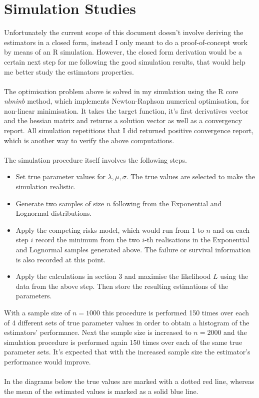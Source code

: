 \documentclass{article}
\begin{document}
\section{Simulation Studies}
\indent \indent Unfortunately the current scope of this document doesn't involve deriving the estimators in a closed form, instead I only meant to do a proof-of-concept work by means of an R simulation. However, the closed form derivation would be a certain next step for me following the good simulation results, that would help me better study the estimators properties. 
\\
\\
\indent The optimisation problem above is solved in my simulation using the R core \textit{nlminb} method, which implements Newton-Raphson numerical optimisation, for non-linear minimisation. It takes the target function, it's first derivatives vector and the hessian matrix and returns a solution vector as well as a convergency report. All simulation repetitions that I did returned positive convergence report, which is another way to verify the above computations.
\\
\\
\indent The simulation procedure itself involves the following steps.
\begin{itemize}
\item Set true parameter values for $\lambda, \mu, \sigma$. The true values are selected to make the simulation realistic. 
\item Generate two samples of size $n$ following from the Exponential and Lognormal distributions.
\item Apply the competing risks model, which would run from 1 to $n$ and on each step $i$ record the minimum from the two $i$-th realisations in the Exponential and Lognormal samples generated above. The failure or survival information is also recorded at this point.
\item Apply the calculations in section 3 and maximise the likelihood $L$ using the data from the above step. Then store the resulting estimations of the parameters.
\end{itemize}
\indent With a sample size of $n = 1000$ this procedure is performed 150 times over each of 4 different sets of true parameter values in order to obtain a histogram of the estimators' performance. Next the sample size is increased to $n = 2000$ and the simulation procedure is performed again 150 times over each of the same true parameter sets. It's expected that with the increased sample size the estimator's performance would improve.
\\
\\
\indent In the diagrams below the true values are marked with a dotted red line, whereas the mean of the estimated values is marked as a solid blue line. 
\end{document}
